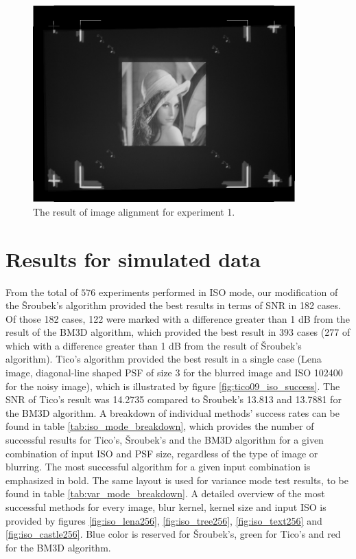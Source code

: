 \documentclass[12pt,notitlepage]{report}
\begin{document}
\begin{figure}[h]
 \centering
  \includegraphics[width=0.9\textwidth]{alignment_process.png}
 \caption[The result of image alignment for experiment 1]{The result of image alignment for experiment 1.}
 \label{fig:alignment_process}
\end{figure}

\clearpage

\section{Results for simulated data}
\label{sec:simulated_data}

From the total of $576$ experiments performed in ISO mode, our modification of the Šroubek's algorithm provided the best results in terms of SNR in 182 cases. Of those 182 cases, 122 were marked with a difference greater than 1 dB from the result of the BM3D algorithm, which provided the best result in 393 cases (277 of which with a difference greater than 1 dB from the result of Šroubek's algorithm). Tico's algorithm provided the best result in a single case (Lena image, diagonal-line shaped PSF of size 3 for the blurred image and ISO 102400 for the noisy image), which is illustrated by figure \ref{fig:tico09_iso_success}.  The SNR of Tico's result was 14.2735 compared to Šroubek's 13.813 and 13.7881 for the BM3D algorithm. A breakdown of individual methods' success rates can be found in table \ref{tab:iso_mode_breakdown}, which provides the number of successful results for Tico's, Šroubek's and the BM3D algorithm for a given combination of input ISO and PSF size, regardless of the type of image or blurring. The most successful algorithm for a given input combination is emphasized in bold. The same layout is used for variance mode test results, to be found in table \ref{tab:var_mode_breakdown}. A detailed overview of the most successful methods for every image, blur kernel, kernel size and input ISO is provided by figures \ref{fig:iso_lena256}, \ref{fig:iso_tree256}, \ref{fig:iso_text256} and \ref{fig:iso_castle256}. Blue color is reserved for Šroubek's, green for Tico's and red for the BM3D algorithm.       
\end{document}

